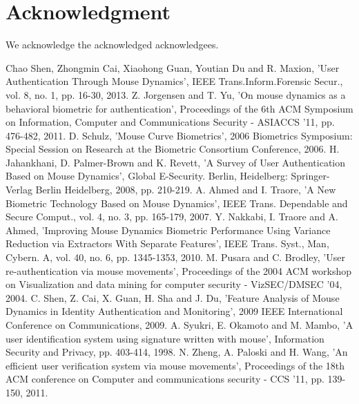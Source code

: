 \documentclass[conference]{IEEEtran}
\begin{document}
\section*{Acknowledgment}
We acknowledge the acknowledged acknowledgees.


\begin{thebibliography}{100} %


 Chao Shen, Zhongmin Cai, Xiaohong Guan, Youtian Du and R. Maxion, 'User Authentication Through Mouse Dynamics', IEEE Trans.Inform.Forensic Secur., vol. 8, no. 1, pp. 16-30, 2013.
 Z. Jorgensen and T. Yu, 'On mouse dynamics as a behavioral biometric for authentication', Proceedings of the 6th ACM Symposium on Information, Computer and Communications Security - ASIACCS '11, pp. 476-482, 2011.
D. Schulz, 'Mouse Curve Biometrics', 2006 Biometrics Symposium: Special Session on Research at the Biometric Consortium Conference, 2006.
 H. Jahankhani, D. Palmer-Brown and K. Revett, 'A Survey of User Authentication Based on Mouse Dynamics', Global E-Security. Berlin, Heidelberg: Springer-Verlag Berlin Heidelberg, 2008, pp. 210-219.
 A. Ahmed and I. Traore, 'A New Biometric Technology Based on Mouse Dynamics', IEEE Trans. Dependable and Secure Comput., vol. 4, no. 3, pp. 165-179, 2007.
Y. Nakkabi, I. Traore and A. Ahmed, 'Improving Mouse Dynamics Biometric Performance Using Variance Reduction via Extractors With Separate Features', IEEE Trans. Syst., Man, Cybern. A, vol. 40, no. 6, pp. 1345-1353, 2010.
M. Pusara and C. Brodley, 'User re-authentication via mouse movements', Proceedings of the 2004 ACM workshop on Visualization and data mining for computer security - VizSEC/DMSEC '04, 2004.
C. Shen, Z. Cai, X. Guan, H. Sha and J. Du, 'Feature Analysis of Mouse Dynamics in Identity Authentication and Monitoring', 2009 IEEE International Conference on Communications, 2009.
A. Syukri, E. Okamoto and M. Mambo, 'A user identification system using signature written with mouse', Information Security and Privacy, pp. 403-414, 1998.
N. Zheng, A. Paloski and H. Wang, 'An efficient user verification system via mouse movements', Proceedings of the 18th ACM conference on Computer and communications security - CCS '11, pp. 139-150, 2011.

\end{thebibliography}
\end{document}

